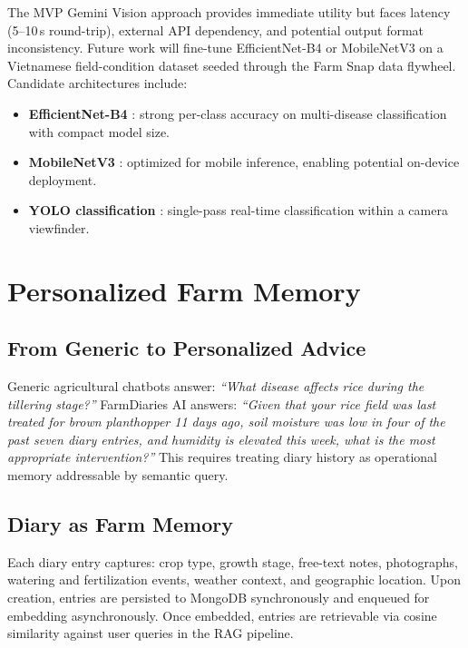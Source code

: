\documentclass[conference]{IEEEtran}
\begin{document}
The MVP Gemini Vision approach provides immediate utility but faces latency (5--10\,s round-trip), external API dependency, and potential output format inconsistency. Future work will fine-tune EfficientNet-B4 or MobileNetV3 on a Vietnamese field-condition dataset seeded through the Farm Snap data flywheel. Candidate architectures include:
\begin{itemize}
    \item \textbf{EfficientNet-B4} \cite{tan2019}: strong per-class accuracy on multi-disease classification with compact model size.
    \item \textbf{MobileNetV3} \cite{howard2019}: optimized for mobile inference, enabling potential on-device deployment.
    \item \textbf{YOLO classification} \cite{redmon2016}: single-pass real-time classification within a camera viewfinder.
\end{itemize}

\section{Personalized Farm Memory}

\subsection{From Generic to Personalized Advice}

Generic agricultural chatbots answer: \textit{``What disease affects rice during the tillering stage?''} FarmDiaries AI answers: \textit{``Given that your rice field was last treated for brown planthopper 11 days ago, soil moisture was low in four of the past seven diary entries, and humidity is elevated this week, what is the most appropriate intervention?''} This requires treating diary history as operational memory addressable by semantic query.

\subsection{Diary as Farm Memory}

Each diary entry captures: crop type, growth stage, free-text notes, photographs, watering and fertilization events, weather context, and geographic location. Upon creation, entries are persisted to MongoDB synchronously and enqueued for embedding asynchronously. Once embedded, entries are retrievable via cosine similarity against user queries in the RAG pipeline.
\end{document}
